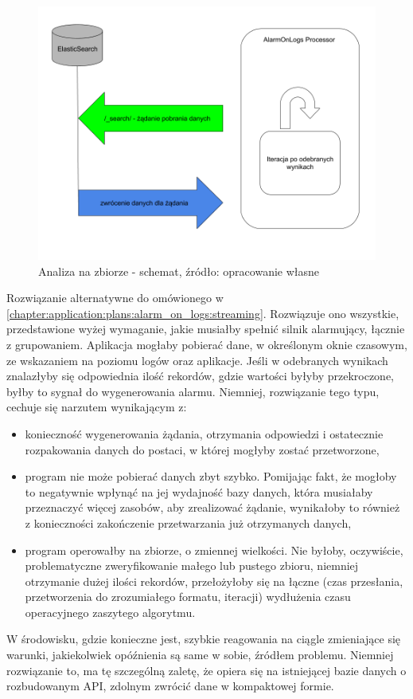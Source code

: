     \begin{figure}[H]
        \centering
        \includegraphics[width=1.0\textwidth]{images/aol_batch}
        \caption[Analiza na zbiorze - schemat]{
            Analiza na zbiorze - schemat, 
            źródło: opracowanie własne
        }
        \label{chapter:application:plans:alarm_on_logs:bulk:diagram}
    \end{figure}
    
    Rozwiązanie alternatywne do omówionego w \ref{chapter:application:plans:alarm_on_logs:streaming}. Rozwiązuje ono wszystkie, przedstawione
    wyżej wymaganie, jakie musiałby spełnić silnik alarmujący, łącznie z grupowaniem. Aplikacja mogłaby pobierać dane, w określonym oknie czasowym,
    ze wskazaniem na poziomu logów oraz aplikacje. Jeśli w odebranych wynikach znalazłyby się odpowiednia
    ilość rekordów, gdzie wartości byłyby przekroczone, byłby to sygnał do wygenerowania alarmu. Niemniej, rozwiązanie tego typu, cechuje się
    narzutem wynikającym z:
    \begin{itemize}
        \item konieczność wygenerowania żądania, otrzymania odpowiedzi i ostatecznie rozpakowania danych do postaci, w której mogłyby zostać
        przetworzone,
        \item program nie może pobierać danych zbyt szybko. Pomijając fakt, że mogłoby to negatywnie wpłynąć na jej wydajność bazy danych, która
        musiałaby przeznaczyć więcej zasobów, aby zrealizować żądanie, wynikałoby to również z konieczności zakończenie przetwarzania już
        otrzymanych danych,
        \item program operowałby na zbiorze, o zmiennej wielkości. Nie byłoby, oczywiście, problematyczne zweryfikowanie małego lub pustego zbioru,
        niemniej otrzymanie dużej ilości rekordów, przełożyłoby się na łączne (czas przesłania, przetworzenia do zrozumiałego formatu, iteracji)
        wydłużenia czasu operacyjnego zaszytego algorytmu. 
    \end{itemize}
    W środowisku, gdzie konieczne jest, szybkie reagowania na ciągle zmieniające się warunki, jakiekolwiek opóźnienia są same w sobie, źródłem
    problemu. Niemniej rozwiązanie to, ma tę szczególną zaletę, że opiera się na istniejącej bazie danych o rozbudowanym API, zdolnym
    zwrócić dane w kompaktowej formie.
    
